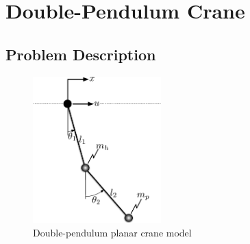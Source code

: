 
\section{Double-Pendulum Crane}
\subsection{Problem Description}
%
\begin{figure}[tb]
\begin{center}
\includegraphics[width = 0.44\textwidth]{figures/figures_RL_model_based_control/Double_pendulum_crane_model.pdf}
\caption{Double-pendulum planar crane model}
\label{fig_chap2:planar_crane}
\end{center}
\end{figure}
%

